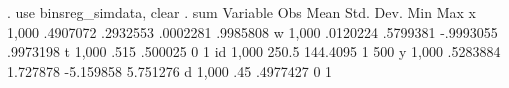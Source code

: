 . use binsreg_simdata, clear
{\smallskip}
. sum
{\smallskip}
    Variable {\VBAR}        Obs        Mean    Std. Dev.       Min        Max
           x {\VBAR}      1,000    .4907072    .2932553   .0002281   .9985808
           w {\VBAR}      1,000    .0120224    .5799381  -.9993055   .9973198
           t {\VBAR}      1,000        .515     .500025          0          1
          id {\VBAR}      1,000       250.5    144.4095          1        500
           y {\VBAR}      1,000    .5283884    1.727878  -5.159858   5.751276
           d {\VBAR}      1,000         .45    .4977427          0          1
{\smallskip}
